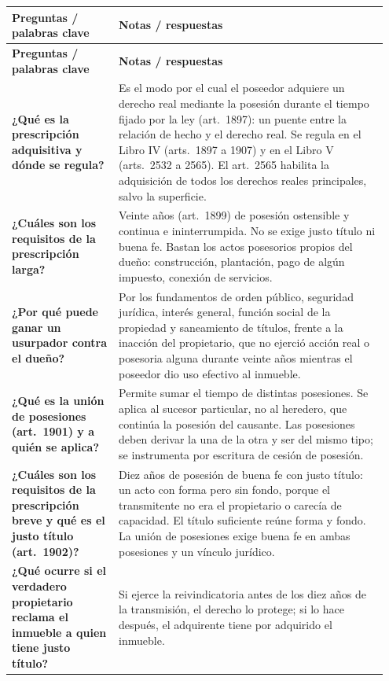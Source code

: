 \documentclass[12pt,oneside]{book}
\makeatletter
\newenvironment{cornell}{%
    \par\vspace{0.5em}
    \noindent
    \begin{longtable}{@{}>{\raggedright\arraybackslash}p{0.27\linewidth}
                         >{\raggedright\arraybackslash}p{0.68\linewidth}@{}}
    \toprule
    \textbf{Preguntas / palabras clave} & \textbf{Notas / respuestas} \\
    \midrule
    \endfirsthead
    \toprule
    \textbf{Preguntas / palabras clave} & \textbf{Notas / respuestas} \\
    \midrule
    \endhead
}{%
    \bottomrule
    \end{longtable}
}
\makeatother
\begin{document}
\begin{cornell}
\textbf{¿Qué es la prescripción adquisitiva y dónde se regula?} &
Es el modo por el cual el poseedor adquiere un derecho real mediante la posesión durante el tiempo fijado por la ley (art.~1897): un puente entre la relación de hecho y el derecho real. Se regula en el Libro IV (arts.~1897 a 1907) y en el Libro V (arts.~2532 a 2565). El art.~2565 habilita la adquisición de todos los derechos reales principales, salvo la superficie. \\

\textbf{¿Cuáles son los requisitos de la prescripción larga?} &
Veinte años (art.~1899) de posesión ostensible y continua e ininterrumpida. No se exige justo título ni buena fe. Bastan los actos posesorios propios del dueño: construcción, plantación, pago de algún impuesto, conexión de servicios. \\

\textbf{¿Por qué puede ganar un usurpador contra el dueño?} &
Por los fundamentos de orden público, seguridad jurídica, interés general, función social de la propiedad y saneamiento de títulos, frente a la inacción del propietario, que no ejerció acción real o posesoria alguna durante veinte años mientras el poseedor dio uso efectivo al inmueble. \\

\textbf{¿Qué es la unión de posesiones (art.~1901) y a quién se aplica?} &
Permite sumar el tiempo de distintas posesiones. Se aplica al sucesor particular, no al heredero, que continúa la posesión del causante. Las posesiones deben derivar la una de la otra y ser del mismo tipo; se instrumenta por escritura de cesión de posesión. \\

\textbf{¿Cuáles son los requisitos de la prescripción breve y qué es el justo título (art.~1902)?} &
Diez años de posesión de buena fe con justo título: un acto con forma pero sin fondo, porque el transmitente no era el propietario o carecía de capacidad. El título suficiente reúne forma y fondo. La unión de posesiones exige buena fe en ambas posesiones y un vínculo jurídico. \\

\textbf{¿Qué ocurre si el verdadero propietario reclama el inmueble a quien tiene justo título?} &
Si ejerce la reivindicatoria antes de los diez años de la transmisión, el derecho lo protege; si lo hace después, el adquirente tiene por adquirido el inmueble. \\


\end{cornell}
\end{document}
